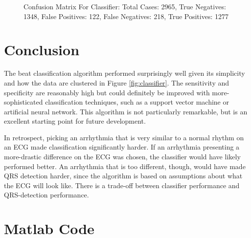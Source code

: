\documentclass[12pt,letter]{article}
\begin{document}
\begin{figure}[htbp]
    \centering
    \label{fig:confusion}
    \caption{Confusion Matrix For Classifier: Total Cases: 2965, True Negatives:
    1348, False Positives: 122, False Negatives: 218, True Positives: 1277}
\end{figure}

\section{Conclusion}
The beat classification algorithm performed surprisingly well given its
simplicity and how the data are clustered in Figure \ref{fig:classifier}.  The
sensitivity and specificity are reasonably high but could definitely be improved
with more-sophisticated classification techniques, such as a support vector
machine or artificial neural network.  This algorithm is not particularly
remarkable, but is an excellent starting point for future development.  

In retrospect, picking an arrhythmia that is very similar to a normal rhythm on
an ECG made classification significantly harder.  If an arrhythmia presenting a
more-drastic difference on the ECG was chosen, the classifier would have likely
performed better.  An arrhythmia that is too different, though, would have made
QRS detection harder, since the algorithm is based on assumptions about what the
ECG will look like.  There is a trade-off between classifier performance and
QRS-detection performance.  

\newpage
\appendix
\section{Matlab Code}
\end{document}
